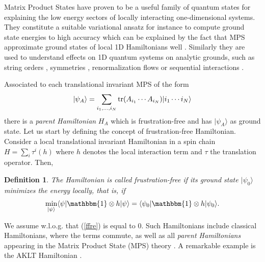 \documentclass[journal,twoside]{IEEEtran}
\newtheorem{definition}[theorem]{Definition}
\newcommand{\1}{\mathbbm{1}}
\renewcommand{\>}{\rangle}
\newcommand{\<}{\langle}
\def\1{\mathbbm{1}}
\begin{document}
Matrix Product States have proven to be a useful family of quantum
states for explaining the low energy sectors of locally interacting
one-dimensional systems. They constitute a suitable variational
ansatz for instance to compute ground state energies to high
accuracy \cite{Frank-advances} which can be explained by the fact
that MPS approximate ground states of local 1D Hamiltonians well
\cite{Hastings}. Similarly they are used to understand effects on 1D
quantum systems on analytic grounds, such as string orders
\cite{PWSVC08}, symmetries \cite{SWPC09}, renormalization flows
\cite{renormalization} or sequential interactions \cite{sequential,sequential2}.

Associated to each translational invariant MPS of the form
\begin{equation}\label{eq:TI-MPS}
|\psi_A\>=\sum_{i_1,\ldots, i_N}{\rm tr}(A_{i_1}\cdots A_{i_N})|i_1\cdots i_N\>
\end{equation}
there is a {\it parent Hamiltonian} $H_A$ which is frustration-free
and has $|\psi_A\>$ as ground state. Let us start by defining the
concept of frustration-free Hamiltonian. Consider a local
translational invariant Hamiltonian in a spin chain $H=\sum_i
\tau^i(h)$ where $h$ denotes the local interaction term and $\tau$
the translation operator. Then,
\begin{definition}
The Hamiltonian is called \emph{frustration-free} if its ground
state $|\psi_0\>$ minimizes the energy {\it locally}, that is, if
\begin{equation}\label{ffre}
\min_{|\psi\>}\<\psi|\1\otimes h|\psi\>=\<\psi_0|\1\otimes h|\psi_0\>.
 \end{equation}
 \end{definition}
We assume w.l.o.g. that (\ref{ffre}) is equal to $0$.  Such
Hamiltonians include classical Hamiltonians, where the terms
commute, as well as all {\it parent Hamiltonians} appearing in the
Matrix Product State (MPS) theory \cite{FNW92,PVWC07,SCP10}. A
remarkable example is the AKLT Hamiltonian \cite{AKLT88}.
\end{document}
